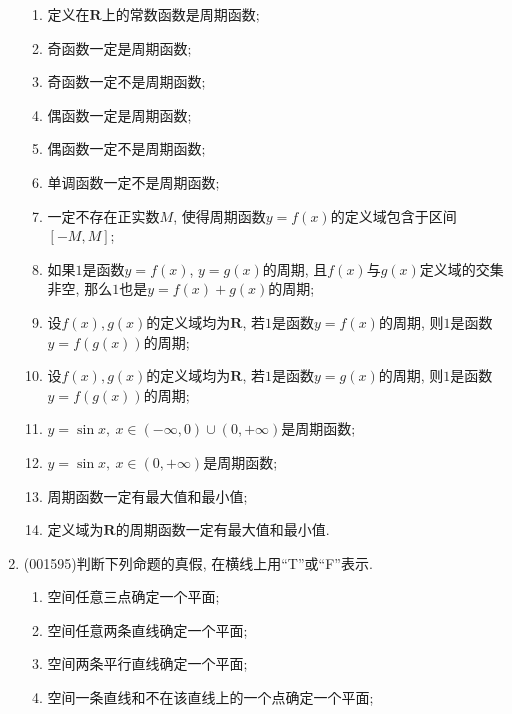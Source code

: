 \documentclass[10pt,a4paper]{article}
\newcommand{\blank}[1]{\underline{\hbox to #1pt{}}}
\begin{document}
\begin{enumerate}[1.]
\begin{enumerate}[\blank{30}(1)]
\item 定义在$\mathbf{R}$上的常数函数是周期函数;\\ 
\item 奇函数一定是周期函数;\\ 
\item 奇函数一定不是周期函数;\\ 
\item 偶函数一定是周期函数;\\ 
\item 偶函数一定不是周期函数;\\ 
\item 单调函数一定不是周期函数;\\ 
\item 一定不存在正实数$M$, 使得周期函数$y=f(x)$的定义域包含于区间$[-M,M]$;\\ 
\item 如果$1$是函数$y=f(x)$, $y=g(x)$的周期, 且$f(x)$与$g(x)$定义域的交集非空, 那么$1$也是$y=f(x)+g(x)$的周期;\\ 
\item 设$f(x),g(x)$的定义域均为$\mathbf{R}$, 若$1$是函数$y=f(x)$的周期, 则$1$是函数$y=f(g(x))$的周期;\\ 
\item 设$f(x),g(x)$的定义域均为$\mathbf{R}$, 若$1$是函数$y=g(x)$的周期, 则$1$是函数$y=f(g(x))$的周期;\\ 
\item $y=\sin x,\ x\in (-\infty,0)\cup (0,+\infty)$是周期函数;\\ 
\item $y=\sin x,\ x\in (0,+\infty)$是周期函数;\\ 
\item 周期函数一定有最大值和最小值;\\ 
\item 定义域为$\mathbf{R}$的周期函数一定有最大值和最小值.\\ 
\end{enumerate}
\item {\tiny (001595)}判断下列命题的真假, 在横线上用``T''或``F''表示.
\begin{enumerate}[\blank{30}(1)]
\item 空间任意三点确定一个平面;\\ 
\item 空间任意两条直线确定一个平面;\\ 
\item 空间两条平行直线确定一个平面;\\ 
\item 空间一条直线和不在该直线上的一个点确定一个平面;\\ 

\end{enumerate}
\end{enumerate}
\end{document}
